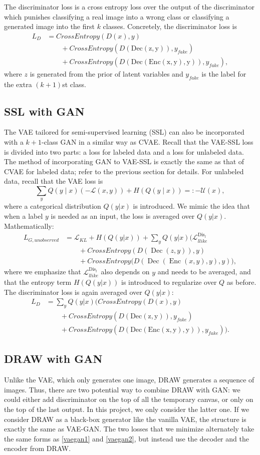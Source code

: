 \documentclass[10pt]{article}
\newcommand{\op}[1]{\operatorname{#1}}
\begin{document}
The discriminator loss is a cross entropy loss over the output of the discriminator which punishes classifying a real image into a wrong class or classifying a generated image into the first $k$ classes. Concretely, the discriminator loss is
\begin{align}
L_D &= CrossEntropy(D(x),y)\\
&\qquad + CrossEntropy(D(\op{Dec(z,y)}),y_{fake})\\
&\qquad +CrossEntropy(D(\op{Dec(Enc(x,y),y)}),y_{fake}),
\end{align}
where $z$ is generated from the prior of latent variables and $y_{fake}$ is the label for the extra $(k+1)$st class.


\subsection{SSL with GAN}
The VAE tailored for semi-supervised learning (SSL) can also be incorporated with a $k+1$-class GAN in a similar way as CVAE. Recall that the VAE-SSL loss is divided into two parts: a loss for labeled data and a loss for unlabeled data. The method of incorporating GAN to VAE-SSL is exactly the same as that of CVAE for labeled data; refer to the previous section for details. For unlabeled data, recall that the VAE loss is
$$
\sum_y Q(y \mid x) (-\mathcal{L}(x,y)) + H(Q(y \mid x)) =: -\mathcal{U}(x),
$$
where a categorical distribution $Q(y|x)$ is introduced. We mimic the idea that when a label $y$ is needed as an input, the loss is averaged over $Q(y|x)$. Mathematically:
\begin{align}
L_{G,unobserved} &= \mathcal{L}_{KL} + H(Q(y|x))+\sum_y Q(y|x)\Big(\mathcal{L}_{llike}^{\op{Dis}_l} \\
&\qquad +CrossEntropy(D(\op{Dec}(z,y)),y)\\
&\qquad +CrossEntropy(D(\op{Dec}(\op{Enc}(x,y),y),y)\Big),
\end{align}
where we emphasize that $\mathcal{L}_{llike}^{\op{Dis}_l}$ also depends on $y$ and needs to be averaged, and that the entropy term $H(Q(y|x))$ is introduced to regularize over $Q$ as before.
The discriminator loss is again averaged over $Q(y|x)$:
\begin{align}
L_D &= \sum_y Q(y|x)\big(CrossEntropy(D(x),y)\\
&\qquad + CrossEntropy(D(\op{Dec(z,y)}),y_{fake}) \\
&\qquad +CrossEntropy(D(\op{Dec(Enc(x,y),y)}),y_{fake})\big).
\end{align}
\subsection{DRAW with GAN}
Unlike the VAE, which only generates one image, DRAW generates a sequence of images.
Thus, there are two potential way to combine DRAW with GAN: we could either add discriminator on the top of all the temporary canvas, or only on the top of the last output.
In this project, we only consider the latter one.
If we consider DRAW as a black-box generator like the vanilla VAE, the structure is exactly the same as VAE-GAN.
The two losses that we minimize alternately take the same forms as \eqref{vaegan1} and \eqref{vaegan2}, but instead use the decoder and the encoder from DRAW.
\end{document}
